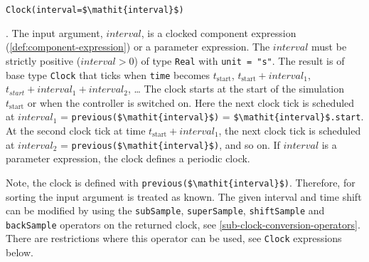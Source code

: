 \begin{operatordefinition*}[Clock]\label{modelica:clock-interval}
\begin{synopsis}\begin{lstlisting}
Clock(interval=$\mathit{interval}$)
\end{lstlisting}\end{synopsis}
\begin{semantics}
.
The input argument, $\mathit{interval}$, is a clocked component expression (\cref{def:component-expression}) or a parameter expression.
The $\mathit{interval}$ must be strictly positive ($\mathit{interval} > 0$) of type \lstinline!Real! with \lstinline!unit = "s"!.
The result is of base type \lstinline!Clock! that ticks when \lstinline!time! becomes $t_{\mathrm{start}}$, $t_{\mathrm{start}} + \mathit{interval}_{1}$, $t_{\mathit{start}} + \mathit{interval}_{1} + \mathit{interval}_{2}$, \@\ldots{}
The clock starts at the start of the simulation $t_{\mathrm{start}}$ or when the controller is switched on.
Here the next clock tick is scheduled at $\mathit{interval}_{1}$ = \lstinline!previous($\mathit{interval}$)! = \lstinline!$\mathit{interval}$.start!.
At the second clock tick at time $t_{\mathrm{start}} + \mathit{interval}_{1}$, the next clock tick is scheduled at $\mathit{interval}_{2}$ = \lstinline!previous($\mathit{interval}$)!, and so on.
If $\mathit{interval}$ is a parameter expression, the clock defines a periodic clock.

\begin{nonnormative}
Note, the clock is defined with \lstinline!previous($\mathit{interval}$)!.  Therefore, for sorting the input argument is treated as known.  The given interval and time shift can be modified by using the \lstinline!subSample!, \lstinline!superSample!, \lstinline!shiftSample! and \lstinline!backSample! operators on the returned clock, see \cref{sub-clock-conversion-operators}.  There are restrictions where this operator can be used, see \lstinline!Clock! expressions below.
\end{nonnormative}
\end{semantics}
\end{operatordefinition*}

